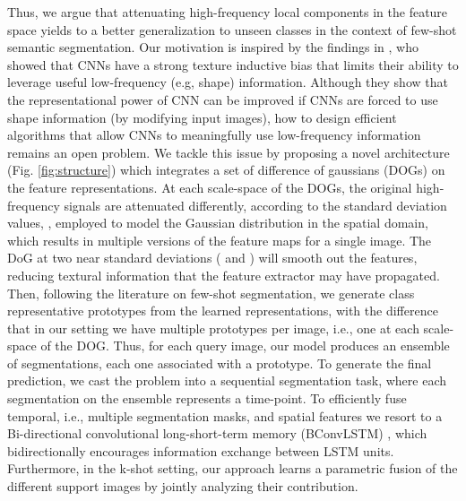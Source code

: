 \documentclass[runningheads]{llncs}
\begin{document}
Thus, we argue that attenuating high-frequency local components in the feature space yields to a better generalization to unseen classes in the context of few-shot semantic segmentation. Our motivation is inspired by the findings in \cite{geirhos2018imagenet}, who showed that CNNs have a strong texture inductive bias that limits their ability to leverage useful low-frequency (e.g, shape) information. Although they show that the representational power of CNN can be improved if CNNs are forced to use shape information (by modifying input images), how to design efficient algorithms that allow CNNs to meaningfully use low-frequency information remains an open problem. We tackle this issue by proposing a novel architecture (Fig. \ref{fig:structure}) which integrates a set of difference of gaussians (DOGs) \cite{lowe2004distinctive} on the feature representations. At each scale-space of the DOGs, the original high-frequency signals are attenuated differently, according to the standard deviation values, , employed to model the Gaussian distribution in the spatial domain, which results in multiple versions of the feature maps for a single image. The DoG at two near standard deviations ( and ) will smooth out the features, reducing textural information that the feature extractor may have propagated. Then, following the literature on few-shot segmentation, we generate class representative prototypes from the learned representations, with the difference that in our setting we have multiple prototypes per image, i.e., one at each scale-space of the DOG. Thus, for each query image, our model produces an ensemble of segmentations, each one associated with a prototype. To generate the final prediction, we cast the problem into a sequential segmentation task, where each segmentation on the ensemble represents a time-point. To efficiently fuse temporal, i.e., multiple segmentation masks, and spatial features we resort to a Bi-directional convolutional long-short-term memory (BConvLSTM) \cite{Song_2018_ECCV}, which bidirectionally encourages information exchange between LSTM units. Furthermore, in the k-shot setting, our approach learns a parametric fusion of the different support images by jointly analyzing their contribution.
\end{document}
